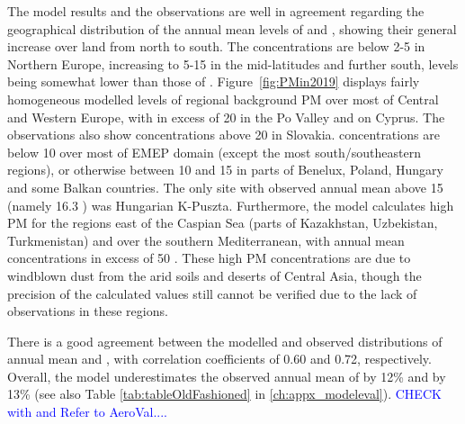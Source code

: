The model results and the observations are well in agreement
regarding the geographical distribution of the annual mean levels of
\PM[10] and \PM[2.5], showing their general increase over land from
north to south. The concentrations are below 2-5 \ug in Northern
Europe, increasing to 5-15 \ug in the mid-latitudes and further south,
\PM[2.5] levels being somewhat lower than those of
\PM[10]. Figure~\ref{fig:PMin2019} displays fairly homogeneous modelled levels of regional background PM over most of Central and Western Europe,
with \PM[10] in excess of 20 \ug in the Po Valley and on Cyprus. The observations also show \PM[10] concentrations above 20 \ug in Slovakia. \PM[2.5] concentrations are below 10 \ug over most of EMEP domain (except the most south/southeastern regions), or otherwise between 10 and 15 \ug in  parts of Benelux, Poland, Hungary and some Balkan countries. The only site with observed annual mean \PM[10] above 15 \ug (namely 16.3 \ug) was Hungarian K-Puszta. Furthermore, the model calculates high PM for the regions east of the Caspian Sea (parts of Kazakhstan, Uzbekistan, Turkmenistan) and over the southern Mediterranean, with annual mean concentrations in excess of 50 \ug. These high PM concentrations are due to windblown dust from the arid soils and deserts of Central Asia, though the precision of the calculated values still cannot be verified due to the lack of observations in these regions.

There is a good agreement between the modelled and observed
distributions of annual mean \PM[10] and \PM[2.5], with correlation
coefficients of 0.60 and 0.72, respectively. Overall, the model
underestimates the observed annual mean of \PM[10] by 12\% and
\PM[2.5] by 13\% (see also Table \ref{tab:tableOldFashioned} in \ref{ch:appx_modeleval}). \textcolor{blue}{CHECK with and Refer to AeroVal....}


